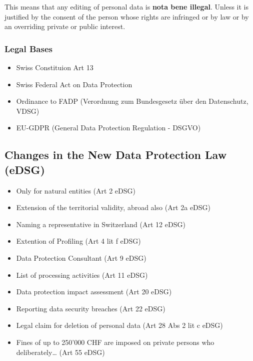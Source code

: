 \documentclass[11pt]{article}
\theoremstyle{definition}
\begin{document}
\vspace{1em}
This means that any editing of personal data is \textbf{nota bene illegal}. Unless it is justified by the consent of the person whose rights are infringed or by law or by an overriding private or public interest.

\subsubsection{Legal Bases}
\begin{itemize}[label=-]
	\item Swiss Constituion Art 13
	\item Swiss Federal Act on Data Protection
	\item Ordinance to FADP (Verordnung zum Bundesgesetz über den Datenschutz, VDSG)
	\item EU-GDPR (General Data Protection Regulation - DSGVO)
\end{itemize}

\subsection{Changes in the New Data Protection Law (eDSG)}

\begin{itemize}[label=-]
	\item Only for natural entities (Art 2 eDSG)
	\item Extension of the territorial validity, abroad also (Art 2a eDSG)
	\item Naming a representative in Switzerland (Art 12 eDSG)
	\item Extention of Profiling (Art 4 lit f eDSG)
	\item Data Protection Consultant (Art 9 eDSG)
	\item List of processing activities (Art 11 eDSG)
	\item Data protection impact assessment (Art 20 eDSG)
	\item Reporting data security breaches (Art 22 eDSG)
	\item Legal claim for deletion of personal data (Art 28 Abs 2 lit c eDSG)
	\item Fines of up to 250'000 CHF are imposed on private persons who deliberately… (Art 55 eDSG)
\end{itemize}
\end{document}
